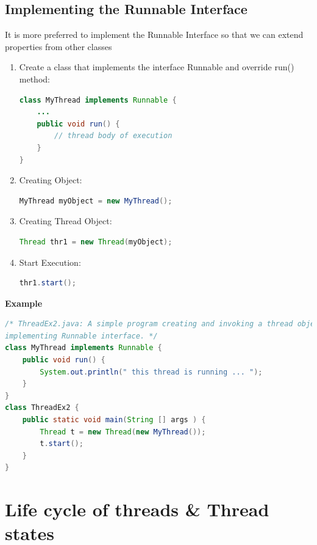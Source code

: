 \documentclass[12pt, a4paper]{book}
\begin{document}
\subsection{Implementing the Runnable Interface}
It is more preferred to implement the Runnable Interface so that we can extend properties from other classes
\begin{enumerate}
    \item Create a class that implements the interface Runnable and override run() method:
          \begin{lstlisting}[language=java]
class MyThread implements Runnable {
    ...
    public void run() {
        // thread body of execution
    }
}
    \end{lstlisting}
    \item Creating Object:
          \begin{lstlisting}[language=java]
        MyThread myObject = new MyThread();
    \end{lstlisting}
    \item Creating Thread Object:
          \begin{lstlisting}[language=java]
        Thread thr1 = new Thread(myObject);
    \end{lstlisting}
    \item Start Execution:
          \begin{lstlisting}[language=java]
        thr1.start();
    \end{lstlisting}
\end{enumerate}
\textbf{Example} \\
\begin{lstlisting}[language=java]
/* ThreadEx2.java: A simple program creating and invoking a thread object by
implementing Runnable interface. */
class MyThread implements Runnable {
    public void run() {
        System.out.println(" this thread is running ... ");
    }
}
class ThreadEx2 {
    public static void main(String [] args ) {
        Thread t = new Thread(new MyThread());
        t.start();
    }
}
\end{lstlisting}
\section{Life cycle of threads \& Thread states}
\end{document}
